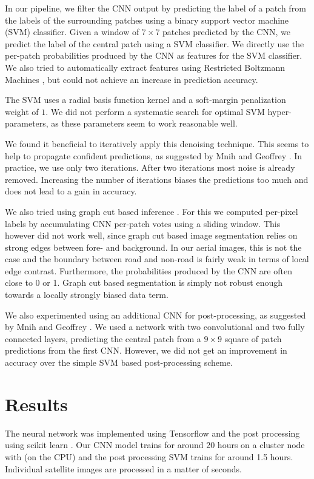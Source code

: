 \documentclass[10pt,conference,compsocconf]{IEEEtran}
\newcommand{\todo}[1]{{\color{red}{\textbf{TODO: #1}}}}
\begin{document}
\par 
In our pipeline, we filter the CNN output by predicting the label of a patch from the labels of the surrounding patches using a binary support vector machine (SVM) classifier. Given a window of $ 7 \times 7 $ patches predicted by the CNN, we predict the label of the central patch using a SVM classifier. We directly use the per-patch probabilities produced by the CNN as features for the SVM classifier. We also tried to automatically extract features using Restricted Boltzmann Machines \cite{smolensky.1986}, but could not achieve an increase in prediction accuracy.
\par
The SVM uses a radial basis function kernel and a soft-margin penalization weight of $ 1 $. We did not perform a systematic search for optimal SVM hyper-parameters, as these parameters seem to work reasonable well.
\par 
We found it beneficial to iteratively apply this denoising technique. This seems to help to propagate confident predictions, as suggested by Mnih and Geoffrey \cite{Mnih.2010}. In practice, we use only two iterations. After two iterations most noise is already removed. Increasing the number of iterations biases the predictions too much and does not lead to a gain in accuracy.

\par
We also tried using graph cut based inference \cite{Boykov.2001}. For this we computed per-pixel labels by accumulating CNN per-patch votes using a sliding window. This however did not work well, since graph cut based image segmentation relies on strong edges between fore- and background. In our aerial images, this is not the case and the boundary between road and non-road is fairly weak in terms of local edge contrast. Furthermore, the probabilities produced by the CNN are often close to 0 or 1. Graph cut based segmentation is simply not robust enough towards a locally strongly biased data term.

\par 
We also experimented using an additional CNN for post-processing, as suggested by Mnih and Geoffrey \cite{Mnih.2010}. We used a network with two convolutional and two fully connected layers, predicting the central patch from a $ 9 \times 9 $ square of patch predictions from the first CNN. However, we did not get an improvement in accuracy over the simple SVM based post-processing scheme.

\section{Results}
\label{sec:results}
The neural network was implemented using Tensorflow \cite{tensorflow.2015} and the post processing using scikit learn \cite{sklearn.2011}. Our CNN model trains for around 20 hours on a cluster node with  \todo{HARDWARE} (on the CPU) and the post processing SVM trains for around 1.5 hours. Individual satellite images are processed in a matter of seconds.
\end{document}
